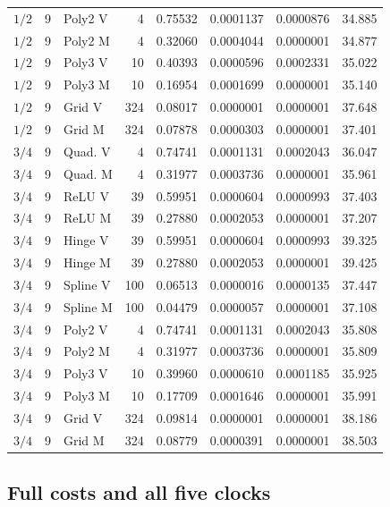 \begin{longtable}{rrlrrrrr}
$1/2$ & 9 & Poly2 V & 4 & 0.75532 & 0.0001137 & 0.0000876 & 34.885\\
$1/2$ & 9 & Poly2 M & 4 & 0.32060 & 0.0004044 & 0.0000001 & 34.877\\
$1/2$ & 9 & Poly3 V & 10 & 0.40393 & 0.0000596 & 0.0002331 & 35.022\\
$1/2$ & 9 & Poly3 M & 10 & 0.16954 & 0.0001699 & 0.0000001 & 35.140\\
$1/2$ & 9 & Grid V & 324 & 0.08017 & 0.0000001 & 0.0000001 & 37.648\\
$1/2$ & 9 & Grid M & 324 & 0.07878 & 0.0000303 & 0.0000001 & 37.401\\
$3/4$ & 9 & Quad. V & 4 & 0.74741 & 0.0001131 & 0.0002043 & 36.047\\
$3/4$ & 9 & Quad. M & 4 & 0.31977 & 0.0003736 & 0.0000001 & 35.961\\
$3/4$ & 9 & ReLU V & 39 & 0.59951 & 0.0000604 & 0.0000993 & 37.403\\
$3/4$ & 9 & ReLU M & 39 & 0.27880 & 0.0002053 & 0.0000001 & 37.207\\
$3/4$ & 9 & Hinge V & 39 & 0.59951 & 0.0000604 & 0.0000993 & 39.325\\
$3/4$ & 9 & Hinge M & 39 & 0.27880 & 0.0002053 & 0.0000001 & 39.425\\
$3/4$ & 9 & Spline V & 100 & 0.06513 & 0.0000016 & 0.0000135 & 37.447\\
$3/4$ & 9 & Spline M & 100 & 0.04479 & 0.0000057 & 0.0000001 & 37.108\\
$3/4$ & 9 & Poly2 V & 4 & 0.74741 & 0.0001131 & 0.0002043 & 35.808\\
$3/4$ & 9 & Poly2 M & 4 & 0.31977 & 0.0003736 & 0.0000001 & 35.809\\
$3/4$ & 9 & Poly3 V & 10 & 0.39960 & 0.0000610 & 0.0001185 & 35.925\\
$3/4$ & 9 & Poly3 M & 10 & 0.17709 & 0.0001646 & 0.0000001 & 35.991\\
$3/4$ & 9 & Grid V & 324 & 0.09814 & 0.0000001 & 0.0000001 & 38.186\\
$3/4$ & 9 & Grid M & 324 & 0.08779 & 0.0000391 & 0.0000001 & 38.503\\
\end{longtable}
\endgroup


\subsection{Full costs and all five clocks}

